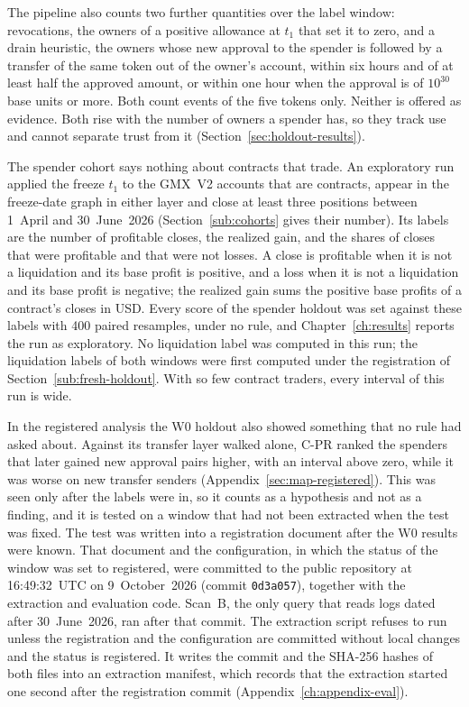 The pipeline also counts two further quantities over the label window: revocations, the owners of a positive allowance at $t_1$ that set it to zero, and a drain heuristic, the owners whose new approval to the spender is followed by a transfer of the same token out of the owner's account, within six hours and of at least half the approved amount, or within one hour when the approval is of $10^{30}$ base units or more. Both count events of the five tokens only. Neither is offered as evidence. Both rise with the number of owners a spender has, so they track use and cannot separate trust from it (Section~\ref{sec:holdout-results}).


The spender cohort says nothing about contracts that trade. An exploratory run applied the freeze $t_1$ to the GMX~V2 accounts that are contracts, appear in the freeze-date graph in either layer and close at least three positions between 1~April and 30~June~2026 (Section~\ref{sub:cohorts} gives their number). Its labels are the number of profitable closes, the realized gain, and the shares of closes that were profitable and that were not losses. A close is profitable when it is not a liquidation and its base profit is positive, and a loss when it is not a liquidation and its base profit is negative; the realized gain sums the positive base profits of a contract's closes in USD. Every score of the spender holdout was set against these labels with 400 paired resamples, under no rule, and Chapter~\ref{ch:results} reports the run as exploratory. No liquidation label was computed in this run; the liquidation labels of both windows were first computed under the registration of Section~\ref{sub:fresh-holdout}. With so few contract traders, every interval of this run is wide.


In the registered analysis the W0 holdout also showed something that no rule had asked about. Against its transfer layer walked alone, C-PR ranked the spenders that later gained new approval pairs higher, with an interval above zero, while it was worse on new transfer senders (Appendix~\ref{sec:map-registered}). This was seen only after the labels were in, so it counts as a hypothesis and not as a finding, and it is tested on a window that had not been extracted when the test was fixed. The test was written into a registration document after the W0 results were known. That document and the configuration, in which the status of the window was set to registered, were committed to the public repository at 16:49:32~UTC on 9~October~2026 (commit \texttt{0d3a057}), together with the extraction and evaluation code. Scan~B, the only query that reads logs dated after 30~June~2026, ran after that commit. The extraction script refuses to run unless the registration and the configuration are committed without local changes and the status is registered. It writes the commit and the SHA-256 hashes of both files into an extraction manifest, which records that the extraction started one second after the registration commit (Appendix~\ref{ch:appendix-eval}).

